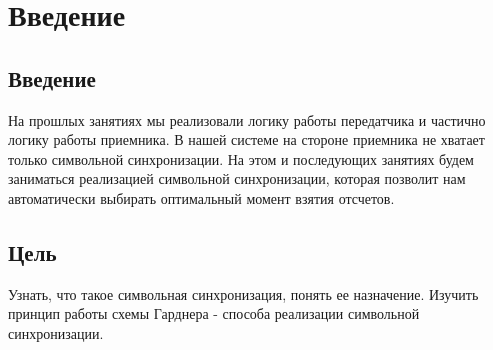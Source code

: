 \chapter{Введение}
\label{ch:intro}

\section{Введение} 

На прошлых занятиях мы реализовали логику работы передатчика и частично логику работы приемника. В нашей системе на стороне приемника
не хватает только символьной синхронизации. На этом и последующих занятиях будем заниматься реализацией символьной синхронизации, которая
позволит нам автоматически выбирать оптимальный момент взятия отсчетов.

\section{Цель} 

Узнать, что такое символьная синхронизация, понять ее назначение. Изучить принцип работы схемы Гарднера - способа реализации
символьной синхронизации.

\endinput